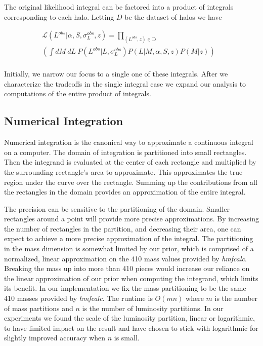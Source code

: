 \documentclass[\docopts]{\docclass}
\begin{document}
The original likelihood integral can be factored into a product of integrals corresponding to each halo. 
Letting $D$ be the dataset of halos we have

\begin{align*}
\mathcal{L}(L^{obs}|\alpha, S, \sigma_L^{obs}, z) = \prod_{(L^{obs}, z) \in \text{D}} &\\
\left(\int dM\ dL\ P(L^{obs}| L, \sigma_L^{obs})P(L|M,\alpha,S,z)P(M|z)\right) &\\
\end{align*}

Initially, we narrow our focus to a single one of these integrals. 
After we characterize the tradeoffs in the single integral case we expand our analysis to computations of the entire product of integrals. 

\subsection{Numerical Integration}
\label{subsec:numint}

Numerical integration is the canonical way to approximate a continuous integral on a computer.
The domain of integration is partitioned into small rectangles.
Then the integrand is evaluated at the center of each rectangle and multiplied by the surrounding rectangle's area to approximate.
This approximates the true region under the curve over the rectangle.
Summing up the contributions from all the rectangles in the domain provides an approximation of the entire integral.

The precision can be sensitive to the partitioning of the domain. 
Smaller rectangles around a point will provide more precise approximations. 
By increasing the number of rectangles in the partition, and decreasing their area, one can expect to achieve a more precise approximation of the integral.
The partitioning in the mass dimension is somewhat limited by our prior, which is comprised of a normalized, linear approximation on the 410 mass values provided by \emph{hmfcalc}. 
Breaking the mass up into more than 410 pieces would increase our reliance on the linear approximation of our prior when computing the integrand, which limits its benefit.
In our implementation we fix the mass partitioning to be the same 410 masses provided by \emph{hmfcalc}.
The runtime is $O(mn)$ where $m$ is the number of mass partitions and $n$ is the number of luminosity partitions.
In our experiments we found the scale of the luminosity partition, linear or logarithmic, to have limited impact on the result and have chosen to stick with logarithmic for slightly improved accuracy when $n$ is small. 
\end{document}
